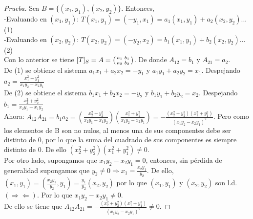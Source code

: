 \documentclass[12pt]{article}
\newenvironment{xmat}
  {\left(\begin{smallmatrix}}
  {\end{smallmatrix}\right)}
\begin{document}
\begin{proof} [Prueba]
Sea $B=\{(x_{1},y_{1}), (x_{2},y_{2})\}$. Entonces,\\
-Evaluando en $(x_{1},y_{1})$: $T(x_{1},y_{1})=(-y_{1},x_{1})=a_{1}(x_{1},y_{1})+a_{2}(x_{2},y_{2})$... (1) \\
-Evaluando en $(x_{2},y_{2})$: $T(x_{2},y_{2})=(-y_{2},x_{2})=b_{1}(x_{1},y_{1})+b_{2}(x_{2},y_{2})$... (2) \\
Con lo anterior se tiene $[T]_{S}=A=\begin{xmat}a_{1} & b_{1}\\a_{2} & b_{2}\end{xmat}$. De donde $A_{12}=b_{1}$ y $A_{21}=a_{2}$.\\
De (1) se obtiene el sistema $a_{1}x_{1}+a_{2}x_{2}=-y_{1}$ y $a_{1}y_{1}+a_{2}y_{2}=x_{1}$. Despejando $a_{2}=\frac{x_{1}^{2}+y_{1}^{2}}{x_{1}y_{2}-x_{2}y_{1}}$\\
De (2) se obtiene el sistema $b_{1}x_{1}+b_{2}x_{2}=-y_{2}$ y $b_{1}y_{1}+b_{2}y_{2}=x_{2}$. Despejando $b_{1}=\frac{x_{2}^{2}+y_{2}^{2}}{x_{2}y_{1}-x_{1}y_{2}}$\\
Ahora: $A_{12}A_{21}=b_{1}a_{2}=(\frac{x_{2}^{2}+y_{2}^{2}}{x_{2}y_{1}-x_{1}y_{2}}) (\frac{x_{1}^{2}+y_{1}^{2}}{x_{1}y_{2}-x_{2}y_{1}})=-
\frac{(x_{2}^{2}+y_{2}^{2})(x_{1}^{2}+y_{1}^{2})}{(x_{1}y_{2}-x_{2}y_{1})^{2}}$. Pero como los elementos de B son no nulos, al menos una de sus componentes debe ser distinto de 0, por lo que la suma del cuadrado de sus componentes es siempre distinto de 0. De ello $(x_{2}^{2}+y_{2}^{2})(x_{1}^{2}+y_{1}^{2}) \neq 0$. \\
Por otro lado, supongamos que $x_{1}y_{2}-x_{2}y_{1}=0$, entonces, sin pérdida de generalidad supongamos que $y_{2} \neq 0 \Longrightarrow x_{1} = \frac{x_{2}y_{1}}{y_{2}}$. De ello, $(x_{1},y_{1})=(\frac{x_{2}y_{1}}{y_{2}}, y_{1})=\frac{y_{1}}{y_{2}}(x_{2},y_{2})$ por lo que $(x_{1},y_{1})$ y $(x_{2},y_{2})$ son l.d. $(\Rightarrow \Leftarrow)$. Por lo que $x_{1}y_{2}-x_{2}y_{1} \neq 0$.\\
De ello se tiene que $A_{12}A_{21}=-\frac{(x_{2}^{2}+y_{2}^{2})(x_{1}^{2}+y_{1}^{2})}{(x_{1}y_{2}-x_{2}y_{1})^{2}} \neq 0$.
\end{proof} 


\end{document}

